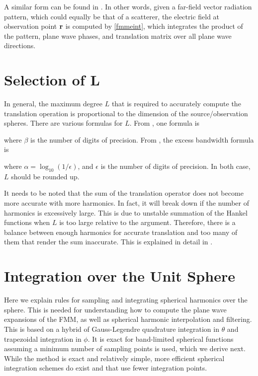 A similar form can be found in \cite{hansen2014exact}.  In other words, given a far-field vector radiation pattern, which could equally be that of a scatterer, the electric field at observation point $\mathbf{r}$ is computed by \eqref{fmmeint}, which integrates the product of the pattern, plane wave phases, and translation matrix over all plane wave directions. %


\section{Selection of L}

In general, the maximum degree $L$ that is required to accurately compute the translation operation is proportional to the dimension of the source/observation spheres.  There are various formulas for $L$. From \cite{song1997multilevel,yucel2008helmholtz}, one formula is

\noindent where $\beta$ is the number of digits of precision. From \cite{song2001error,yucel2008helmholtz}, the excess bandwidth formula is 

\noindent where $\alpha = \log_{10}(1/\epsilon)$, and $\epsilon$ is the number of digits of precision.  In both case, $L$ should be rounded up.

It needs to be noted that the sum of the translation operator does not become more accurate with more harmonics. In fact, it will break down if the number of harmonics is excessively large. This is due to unstable summation of the Hankel functions when $L$ is too large relative to the argument. Therefore, there is a balance between enough harmonics for accurate translation and too many of them that render the sum inaccurate. This is explained in detail in \cite{yucel2008helmholtz}.


\section{Integration over the Unit Sphere}

Here we explain rules for sampling and integrating spherical harmonics over the sphere. This is needed for understanding how to compute the plane wave expansions of the FMM, as well as spherical harmonic interpolation and filtering. This is based on a hybrid of Gauss-Legendre quadrature integration in $\theta$ and trapezoidal integration in $\phi$. It is exact for band-limited spherical functions assuming a minimum number of sampling points is used, which we derive next. While the method is exact and relatively simple, more efficient spherical integration schemes do exist and that use fewer integration points. 

